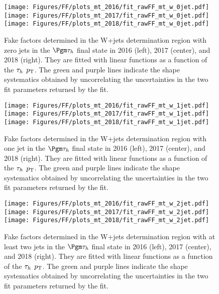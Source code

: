 \begin{figure}[ht!b]
\centering
\texttt{[image: Figures/FF/plots\_mt\_2016/fit\_rawFF\_mt\_w\_0jet.pdf]}
\texttt{[image: Figures/FF/plots\_mt\_2017/fit\_rawFF\_mt\_w\_0jet.pdf]}
\texttt{[image: Figures/FF/plots\_mt\_2018/fit\_rawFF\_mt\_w\_0jet.pdf]}\\
\caption{\label{fig:fit_raw_mt_0jet_w} Fake factors determined in the W+jets determination region with zero jets in the $\Pgm\tauh$ final state in 2016 (left), 2017 (center), and 2018 (right). They are fitted with linear functions as a function of the $\tau_h$ $p_{\mathrm{T}}$. The green and purple lines indicate the shape systematics obtained by uncorrelating the uncertainties in the two fit parameters returned by the fit.  }
\end{figure}

\begin{figure}[ht!b]
\centering
\texttt{[image: Figures/FF/plots\_mt\_2016/fit\_rawFF\_mt\_w\_1jet.pdf]}
\texttt{[image: Figures/FF/plots\_mt\_2017/fit\_rawFF\_mt\_w\_1jet.pdf]}
\texttt{[image: Figures/FF/plots\_mt\_2018/fit\_rawFF\_mt\_w\_1jet.pdf]}\\
\caption{\label{fig:fit_raw_mt_1jet_w} Fake factors determined in the W+jets determination region with one jet in the $\Pgm\tauh$ final state in 2016 (left), 2017 (center), and 2018 (right). They are fitted with linear functions as a function of the $\tau_h$ $p_{\mathrm{T}}$. The green and purple lines indicate the shape systematics obtained by uncorrelating the uncertainties in the two fit parameters returned by the fit.  }
\end{figure}

\begin{figure}[ht!b]
\centering
\texttt{[image: Figures/FF/plots\_mt\_2016/fit\_rawFF\_mt\_w\_2jet.pdf]}
\texttt{[image: Figures/FF/plots\_mt\_2017/fit\_rawFF\_mt\_w\_2jet.pdf]}
\texttt{[image: Figures/FF/plots\_mt\_2018/fit\_rawFF\_mt\_w\_2jet.pdf]}\\
\caption{\label{fig:fit_raw_mt_2jet_w} Fake factors determined in the W+jets determination region with at least two jets in the $\Pgm\tauh$ final state in 2016 (left), 2017 (center), and 2018 (right). They are fitted with linear functions as a function of the $\tau_h$ $p_{\mathrm{T}}$. The green and purple lines indicate the shape systematics obtained by uncorrelating the uncertainties in the two fit parameters returned by the fit.  }
\end{figure}

